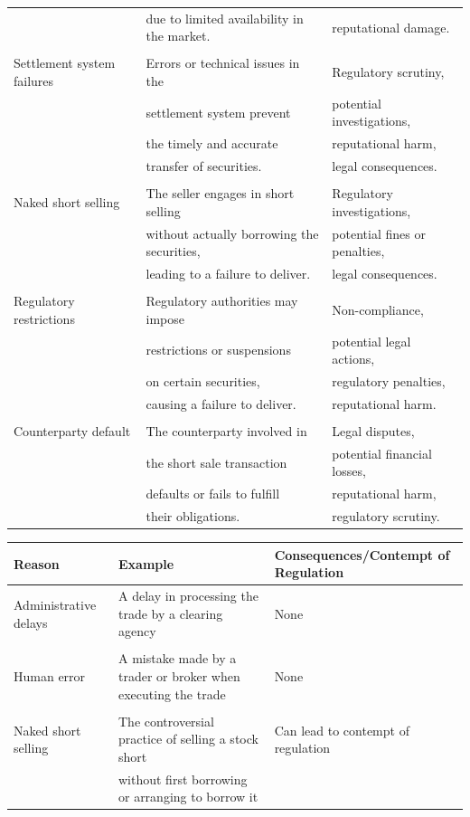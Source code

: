 \documentclass[11pt]{article}
\begin{document}
\begin{center}
\begin{tabular}{lll}
 & due to limited availability in the market. & reputational damage.\\[0pt]
 &  & \\[0pt]
Settlement system failures & Errors or technical issues in the & Regulatory scrutiny,\\[0pt]
 & settlement system prevent & potential investigations,\\[0pt]
 & the timely and accurate & reputational harm,\\[0pt]
 & transfer of securities. & legal consequences.\\[0pt]
 &  & \\[0pt]
Naked short selling & The seller engages in short selling & Regulatory investigations,\\[0pt]
 & without actually borrowing the securities, & potential fines or penalties,\\[0pt]
 & leading to a failure to deliver. & legal consequences.\\[0pt]
 &  & \\[0pt]
Regulatory restrictions & Regulatory authorities may impose & Non-compliance,\\[0pt]
 & restrictions or suspensions & potential legal actions,\\[0pt]
 & on certain securities, & regulatory penalties,\\[0pt]
 & causing a failure to deliver. & reputational harm.\\[0pt]
 &  & \\[0pt]
Counterparty default & The counterparty involved in & Legal disputes,\\[0pt]
 & the short sale transaction & potential financial losses,\\[0pt]
 & defaults or fails to fulfill & reputational harm,\\[0pt]
 & their obligations. & regulatory scrutiny.\\[0pt]
\hline
\end{tabular}
\end{center}

\begin{center}
\begin{tabular}{lll}
\hline
Reason & Example & Consequences/Contempt of Regulation\\[0pt]
\hline
Administrative delays & A delay in processing the trade by a clearing agency & None\\[0pt]
 &  & \\[0pt]
Human error & A mistake made by a trader or broker when executing the trade & None\\[0pt]
 &  & \\[0pt]
Naked short selling & The controversial practice of selling a stock short & Can lead to contempt of regulation\\[0pt]
 & without first borrowing or arranging to borrow it & \\[0pt]
\hline
\end{tabular}
\end{center}
\end{document}
